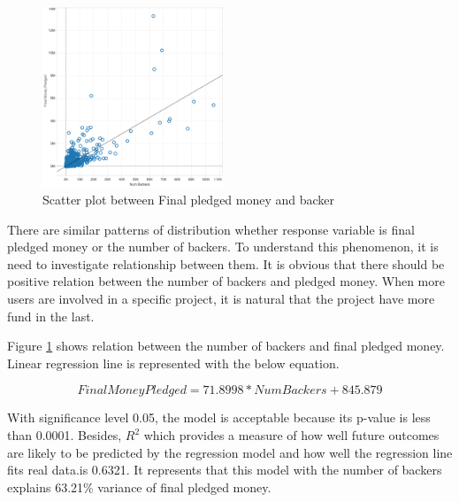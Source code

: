 \begin{figure}[!ht]
\centering
  \includegraphics[width=0.48\textwidth]{figs/backers_money}
    \caption{Scatter plot between Final pledged money and backer}
  \label{fig:scatterMoneyBacker}
\end{figure}

There are similar patterns of distribution whether response variable is final pledged money or the number of backers. To understand this phenomenon, it is need to investigate relationship between them. It is obvious that there should be positive relation between the number of backers and pledged money. When more users are involved in a specific project, it is natural that the project have more fund in the last.

Figure \ref{fig:scatterMoneyBacker} shows relation between the number of backers and final pledged money. 
Linear regression line is represented with the below equation.

\begin{equation}
Final Money Pledged = 71.8998*Num Backers + 845.879	
\end{equation}
 
With significance level 0.05, the model is acceptable because its p-value is less than 0.0001. Besides, $R^2$ which provides a measure of how well future outcomes are likely to be predicted by the regression model and how well the regression line ﬁts real data.is 0.6321. It represents that this model with the number of backers explains 63.21\% variance of final pledged money.

